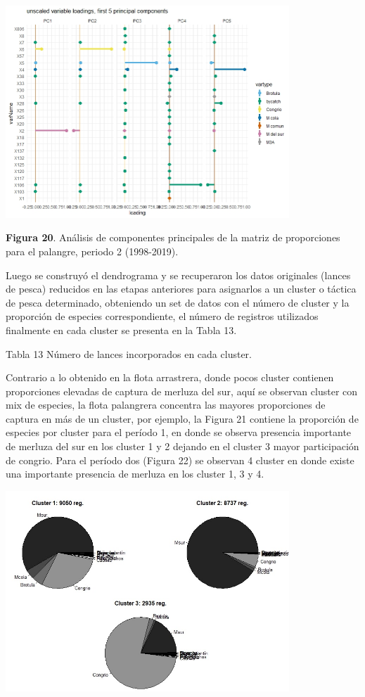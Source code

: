 \documentclass[
  spanish,
]{article}
\begin{document}
\begin{center}
\includegraphics[width=0.8\textwidth]{Figuras/Figura_20.png}
\end{center}

\small \textbf{Figura 20}. Análisis de componentes principales de la
matriz de proporciones para el palangre, periodo 2 (1998-2019).
\vspace{0.5cm} \normalsize 

Luego se construyó el dendrograma y se recuperaron los datos originales
(lances de pesca) reducidos en las etapas anteriores para asignarlos a
un cluster o táctica de pesca determinado, obteniendo un set de datos
con el número de cluster y la proporción de especies correspondiente, el
número de registros utilizados finalmente en cada cluster se presenta en
la Tabla 13.

Tabla 13 Número de lances incorporados en cada cluster.

Contrario a lo obtenido en la flota arrastrera, donde pocos cluster
contienen proporciones elevadas de captura de merluza del sur, aquí se
observan cluster con mix de especies, la flota palangrera concentra las
mayores proporciones de captura en más de un cluster, por ejemplo, la
Figura 21 contiene la proporción de especies por cluster para el período
1, en donde se observa presencia importante de merluza del sur en los
cluster 1 y 2 dejando en el cluster 3 mayor participación de congrio.
Para el período dos (Figura 22) se observan 4 cluster en donde existe
una importante presencia de merluza en los cluster 1, 3 y 4.

\begin{center}
\includegraphics[width=0.8\textwidth]{Figuras/Figura_21.png}
\end{center}
\end{document}
